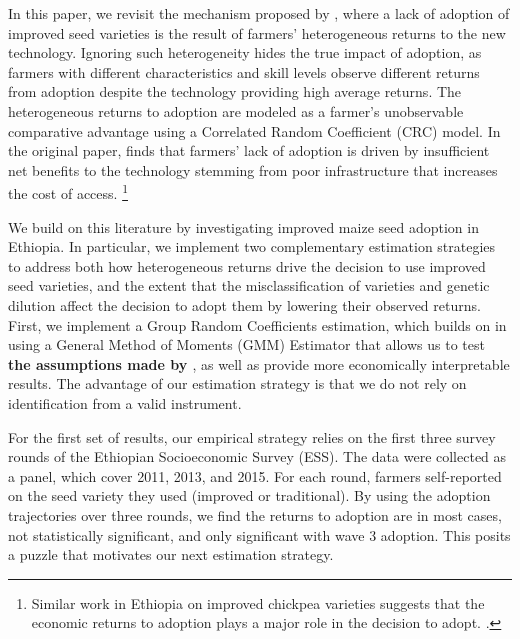 \documentclass[11pt]{article}
\begin{document}

In this paper, we revisit the mechanism proposed by \citep{Suri2011-oi}, where a lack of adoption of improved seed varieties is the result of farmers' heterogeneous returns to the new technology. Ignoring such heterogeneity hides the true impact of adoption, as farmers with different characteristics and skill levels observe different returns from adoption despite the technology providing high average returns. The heterogeneous returns to adoption are modeled as a farmer's unobservable comparative advantage using a Correlated Random Coefficient (CRC) model. In the original paper, \citep{Suri2011-oi} finds that farmers’ lack of adoption is driven by insufficient net benefits to the technology stemming from poor infrastructure that increases the cost of access. \footnote{Similar work in Ethiopia on improved chickpea varieties suggests that the economic returns to adoption plays a major role in the decision to adopt. \citep{Michler2018-wk}.}

We build on this literature by investigating improved maize seed adoption in Ethiopia. In particular, we implement two complementary estimation strategies to address both how heterogeneous returns drive the decision to use improved seed varieties, and the extent that the misclassification of varieties and genetic dilution affect the decision to adopt them by lowering their observed returns. First, we implement a Group Random Coefficients estimation, which builds on \cite{Suri2011-oi} in \cite{Tjernstrom_Emilia_Dalia_Ghanem_Oscar_Barriga_Cabanillas_Travis_J_Lybbert_Jeffrey_D_Michler_and_Aleksandr_Michuda2020-bc} using a General Method of Moments (GMM) Estimator that allows us to test \textbf{ the assumptions made by \cite{Suri2011-oi}}, as well as provide more economically interpretable results. The advantage of our estimation strategy is that we do not rely on identification from a valid instrument. %

For the first set of results, our empirical strategy relies on the first three survey rounds of the Ethiopian Socioeconomic Survey (ESS). The data were collected as a panel, which cover 2011, 2013, and 2015. For each round, farmers self-reported on the seed variety they used (improved or traditional). By using the adoption trajectories over three rounds, we find the returns to adoption are in most cases, not statistically significant, and only significant with wave 3 adoption. This posits a puzzle that motivates our next estimation strategy.
\end{document}
